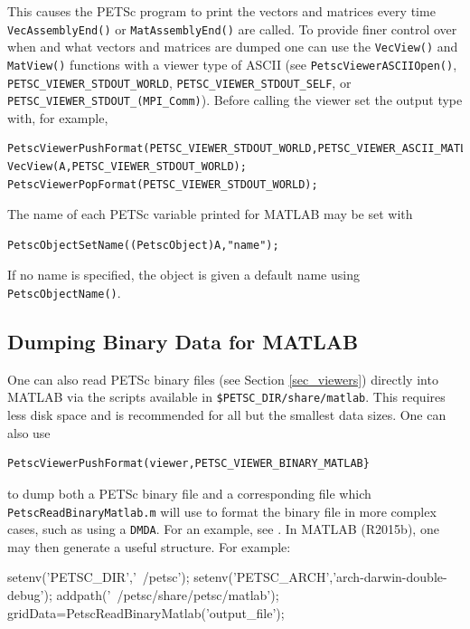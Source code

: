 This causes the PETSc program
to print the vectors and matrices every time \lstinline{VecAssemblyEnd()} or \lstinline{MatAssemblyEnd()} are called.   
To provide finer control
over when and what vectors and matrices are dumped one can use the \lstinline{VecView()} and
\lstinline{MatView()} functions with a viewer type of ASCII (see \lstinline{PetscViewerASCIIOpen()},
\lstinline{PETSC_VIEWER_STDOUT_WORLD}, \lstinline{PETSC_VIEWER_STDOUT_SELF}, or \lstinline{PETSC_VIEWER_STDOUT_(MPI_Comm)}). Before calling
the viewer set the output type with, for example,
\begin{lstlisting}
PetscViewerPushFormat(PETSC_VIEWER_STDOUT_WORLD,PETSC_VIEWER_ASCII_MATLAB);
VecView(A,PETSC_VIEWER_STDOUT_WORLD);
PetscViewerPopFormat(PETSC_VIEWER_STDOUT_WORLD);  
\end{lstlisting}
The name of each PETSc variable printed for MATLAB may be set with
\begin{lstlisting}
PetscObjectSetName((PetscObject)A,"name");
\end{lstlisting}
If no name is specified, the object is given a default name using \lstinline{PetscObjectName()}.

\subsection{Dumping Binary Data for MATLAB}
One can also read PETSc binary files (see Section \ref{sec_viewers}) directly into MATLAB via the scripts available in \lstinline{$PETSC_DIR/share/matlab}.
This requires less disk space and is recommended for all but the smallest data sizes.
One can also use
\begin{lstlisting}
PetscViewerPushFormat(viewer,PETSC_VIEWER_BINARY_MATLAB} 
\end{lstlisting}
to dump both a PETSc binary file and a corresponding  file which 
\lstinline{PetscReadBinaryMatlab.m} will use to format the binary file in more complex cases, such as using a \lstinline{DMDA}. 
For an example, see \href{http://www.mcs.anl.gov/petsc/petsc-current/src/dm/examples/tutorials/ex7.c.html}{}.
In MATLAB (R2015b), one may then generate a useful structure. For example:
\begin{outputlisting}[\normalsize\ttfamily]
setenv('PETSC_DIR','~/petsc');
setenv('PETSC_ARCH','arch-darwin-double-debug');
addpath('~/petsc/share/petsc/matlab');
gridData=PetscReadBinaryMatlab('output_file');
\end{outputlisting}

